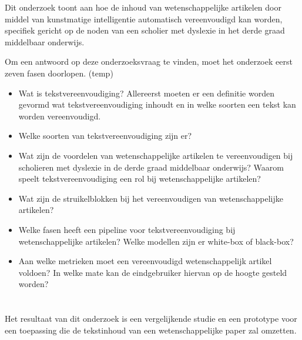 
Dit onderzoek toont aan hoe de inhoud van wetenschappelijke artikelen door middel van kunstmatige intelligentie automatisch vereenvoudigd kan worden, specifiek gericht op de noden van een scholier met dyslexie in het derde graad middelbaar onderwijs.

Om een antwoord op deze onderzoeksvraag te vinden, moet het onderzoek eerst zeven fasen doorlopen. (temp)
\begin{itemize}
	\item Wat is tekstvereenvoudiging? Allereerst moeten er een definitie worden gevormd wat tekstvereenvoudiging inhoudt en in welke soorten een tekst kan worden vereenvoudigd. 
	\item Welke soorten van tekstvereenvoudiging zijn er?
	\item Wat zijn de voordelen van wetenschappelijke artikelen te vereenvoudigen bij scholieren met dyslexie in de derde graad middelbaar onderwijs? Waarom speelt tekstvereenvoudiging een rol bij wetenschappelijke artikelen?
	\item Wat zijn de struikelblokken bij het vereenvoudigen van wetenschappelijke artikelen?
	\item Welke fasen heeft een pipeline voor tekstvereenvoudiging bij wetenschappelijke artikelen? Welke modellen zijn er white-box of black-box?
	\item Aan welke metrieken moet een vereenvoudigd wetenschappelijk artikel voldoen? In welke mate kan de eindgebruiker hiervan op de hoogte gesteld worden? 
\end{itemize}


\section{}%
\label{sec:onderzoeksdoelstelling}


Het resultaat van dit onderzoek is een vergelijkende studie en een prototype voor een toepassing die de tekstinhoud van een wetenschappelijke paper zal omzetten.

